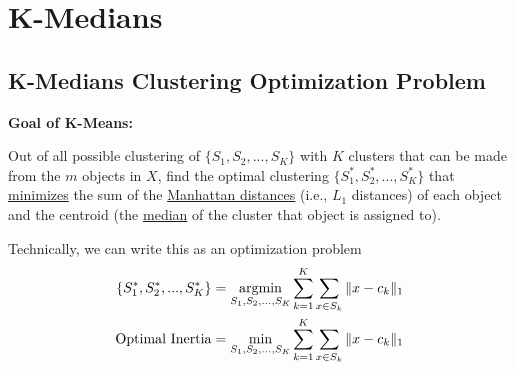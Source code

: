 \documentclass[11pt]{elegantbook}
\newcommand{\argmin}{\operatornamewithlimits{argmin}}
\begin{document}
\section{K-Medians}
\subsection{K-Medians Clustering Optimization Problem}

\textbf{Goal of K-Means:}

Out of all possible clustering of $\{S_1 ,S_2 , ... , S_K\}$ with $K$ clusters that can be made from the $m$ objects in $X$, find the optimal clustering $\{S_1^*,S_2^*,...,S_K^*\}$ that \underline{minimizes} the sum of the \underline{Manhattan distances} (i.e., $L_1$ distances) of each object and the centroid (the \underline{median} of the cluster that object is assigned to).

Technically, we can write this as an optimization problem
\begin{equation}
    \begin{aligned}
        \{S_1^*,S_2^*,...,S_K^*\}=\argmin_{S_1,S_2,...,S_K}\sum_{k=1}^K\sum_{x\in S_k}\|x-c_k\|_1\\
        \textnormal{Optimal Inertia}=\min_{S_1,S_2,...,S_K}\sum_{k=1}^K\sum_{x\in S_k}\|x-c_k\|_1\\
    \end{aligned}
    \nonumber
\end{equation}
\end{document}
